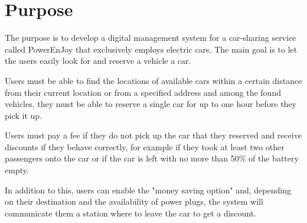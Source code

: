 \section{Purpose}
The purpose is to develop a digital management system for a car-sharing service called PowerEnJoy that exclusively employs electric cars. The main goal is to let the users easily look for and reserve a vehicle a car.

Users must be able to find the locations of available cars within a certain distance from their current location or from a specified address and among the found vehicles, they must be able to reserve a single car for up to one hour before they pick it up.

Users must pay a fee if they do not pick up the car that they reserved and receive discounts if they behave correctly, for example if they took at least two other passengers onto the car or if the car is left with no more than 50\% of the battery empty.

In addition to this, users can enable the "money saving option" and, depending on their destination and the availability of power plugs, the system will communicate them a station where to leave the car to get a discount.
